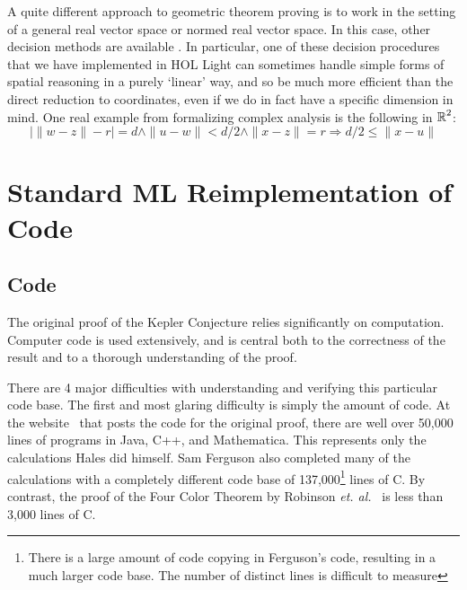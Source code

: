 \documentclass[11pt]{amsart}
\newcommand{\real}{\mbox{$\protect\mathbb R$}}
\let\And=\wedge                    %
\newcommand{\Imp}{\Rightarrow}
\begin{document}
A quite different approach to geometric theorem proving is to work in the
setting of a general real vector space or normed real vector space. In this
case, other decision methods are available \cite{solovay-jointpaper}. In
particular, one of these decision procedures that we have implemented in HOL
Light can sometimes handle simple forms of spatial reasoning in a purely
`linear' way, and so be much more efficient than the direct reduction to
coordinates, even if we do in fact have a specific dimension in mind. One
real example from formalizing complex analysis is the following in $\real^2$:
$$ |\|w - z\| - r| = d \And \|u - w\| < d/2 \And \|x - z\| = r
   \Imp d/2 \leq \|x - u\|
$$




\section{Standard ML Reimplementation of Code}

\subsection*{Code}
\label{sec:code}



The original proof of the Kepler
Conjecture relies significantly
on computation. Computer code is used extensively, and is
central both to the correctness of the result and to a thorough
understanding of the proof. 

  There are 4 major difficulties with understanding and verifying
this particular code base. The first and most glaring difficulty is
simply the amount of code. At the website~\cite{website:Hales:1998:Code}
that posts the code for the original proof,
there are well over 50,000 lines of programs in Java, C++, and
Mathematica. This represents only the calculations Hales did himself.
Sam Ferguson also completed many of the calculations with a completely
different code base of 137,000\footnote{There is a large amount of
code copying in Ferguson's code, resulting in a much larger code base.
The number of distinct lines is difficult to measure} lines of C. By
contrast, the proof of the Four Color Theorem by Robinson \textit{et.
al.}~\cite{Robertson:1997:JCTB} is less than 3,000 lines of C.
\end{document}
